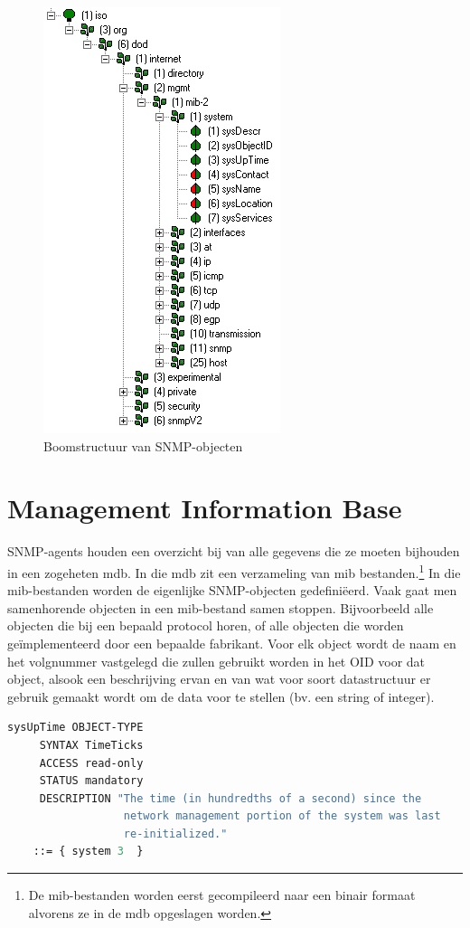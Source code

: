 \begin{figure}[h]
	\centering
	\includegraphics{figures/snmp/OID_tree}
	\caption{Boomstructuur van SNMP-objecten}
	\label{boomstructuur}
\end{figure}


\section{Management Information Base}
SNMP-agents houden een overzicht bij van alle gegevens die ze moeten bijhouden in een zogeheten \gls{mdb}.
In die \gls{mdb} zit een verzameling van \gls{mib} bestanden.\footnote{De \gls{mib}-bestanden worden eerst gecompileerd naar een binair formaat %
alvorens ze in de \gls{mdb} opgeslagen worden.\cite{moreau}}
In die \gls{mib}-bestanden worden de eigenlijke SNMP-objecten gedefiniëerd. Vaak gaat men samenhorende objecten in een \gls{mib}-bestand samen stoppen.
Bijvoorbeeld alle objecten die bij een bepaald protocol horen, of alle objecten die worden geïmplementeerd door een bepaalde fabrikant.
Voor elk object wordt de naam en het volgnummer vastgelegd die zullen gebruikt worden in het OID voor dat object, alsook een beschrijving ervan en
van wat voor soort datastructuur er gebruik gemaakt wordt om de data voor te stellen (bv. een string of integer).

\begin{lstlisting}[language=asn.1, float=h, caption={Definitie van een SNMP-object}, label=lst-definitie-snmp-obj]
sysUpTime OBJECT-TYPE 
	 SYNTAX TimeTicks
	 ACCESS read-only
	 STATUS mandatory
	 DESCRIPTION "The time (in hundredths of a second) since the 
                  network management portion of the system was last 
                  re-initialized."
 	::= { system 3  }
\end{lstlisting}

